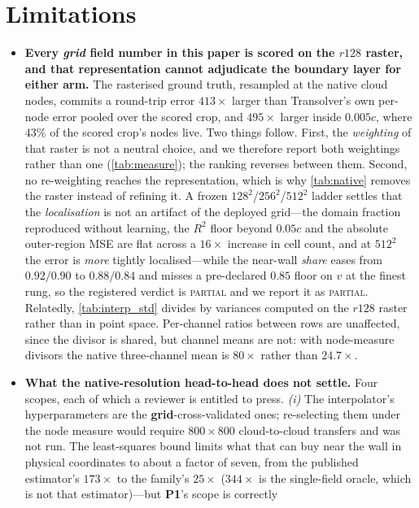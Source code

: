 \section{Limitations}
\label{sec:limitations}

\begin{itemize}
\item \textbf{Every \emph{grid} field number in this paper is scored on the $r128$ raster,
and that representation cannot adjudicate the boundary layer for either arm.} The
rasterised ground truth, resampled at the native cloud nodes, commits a round-trip error
$413\times$ larger than Transolver's own per-node error pooled over the scored crop, and
$495\times$ larger inside $0.005c$, where $43\%$ of the scored crop's nodes live. Two things
follow. First, the \emph{weighting} of that raster is not a neutral choice, and we
therefore report both weightings rather than one (\autoref{tab:measure}); the ranking
reverses between them. Second, no re-weighting reaches the representation, which is why
\autoref{tab:native} removes the raster instead of refining it. A frozen
$128^2$/$256^2$/$512^2$ ladder settles that the \emph{localisation} is not an artifact of
the deployed grid---the domain fraction reproduced without learning, the $R^2$ floor beyond
$0.05c$ and the absolute outer-region MSE are flat across a $16\times$ increase in cell
count, and at $512^2$ the error is \emph{more} tightly localised---while the near-wall
\emph{share} eases from $0.92/0.90$ to $0.88/0.84$ and misses a pre-declared $0.85$ floor
on $v$ at the finest rung, so the registered verdict is \textsc{partial} and we report it
as \textsc{partial}. Relatedly, \autoref{tab:interp_std} divides by variances computed on
the $r128$ raster rather than in point space. Per-channel ratios between rows are
unaffected, since the divisor is shared, but channel means are not: with node-measure
divisors the native three-channel mean is $80\times$ rather than $24.7\times$.
\item \textbf{What the native-resolution head-to-head does not settle.} Four scopes, each
of which a reviewer is entitled to press. \emph{(i)} The interpolator's hyperparameters are
the \textbf{grid}-cross-validated ones; re-selecting them under the node measure would
require $800\times800$ cloud-to-cloud transfers and was not run. The least-squares bound
limits what that can buy near the wall in physical coordinates to about a factor of seven,
from the published estimator's $173\times$ to the family's $25\times$ ($344\times$ is the
single-field oracle, which is not that estimator)---but \textbf{P1}'s scope is correctly

\end{itemize}
